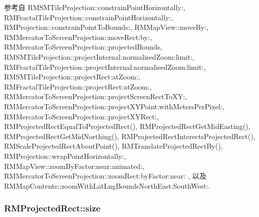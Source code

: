 参考自 R\-M\-S\-M\-Tile\-Projection\-::constrain\-Point\-Horizontally\-:, R\-M\-Fractal\-Tile\-Projection\-::constrain\-Point\-Horizontally\-:, R\-M\-Projection\-::constrain\-Point\-To\-Bounds\-:, R\-M\-Map\-View\-::move\-By\-:, R\-M\-Mercator\-To\-Screen\-Projection\-::move\-Rect\-:by\-:, R\-M\-Mercator\-To\-Screen\-Projection\-::projected\-Bounds, R\-M\-S\-M\-Tile\-Projection\-::project\-Internal\-:normalised\-Zoom\-:limit\-:, R\-M\-Fractal\-Tile\-Projection\-::project\-Internal\-:normalised\-Zoom\-:limit\-:, R\-M\-S\-M\-Tile\-Projection\-::project\-Rect\-:at\-Zoom\-:, R\-M\-Fractal\-Tile\-Projection\-::project\-Rect\-:at\-Zoom\-:, R\-M\-Mercator\-To\-Screen\-Projection\-::project\-Screen\-Rect\-To\-X\-Y\-:, R\-M\-Mercator\-To\-Screen\-Projection\-::project\-X\-Y\-Point\-:with\-Meters\-Per\-Pixel\-:, R\-M\-Mercator\-To\-Screen\-Projection\-::project\-X\-Y\-Rect\-:, R\-M\-Projected\-Rect\-Equal\-To\-Projected\-Rect(), R\-M\-Projected\-Rect\-Get\-Mid\-Easting(), R\-M\-Projected\-Rect\-Get\-Mid\-Northing(), R\-M\-Projected\-Rect\-Interects\-Projected\-Rect(), R\-M\-Scale\-Projected\-Rect\-About\-Point(), R\-M\-Translate\-Projected\-Rect\-By(), R\-M\-Projection\-::wrap\-Point\-Horizontally\-:, R\-M\-Map\-View\-::zoom\-By\-Factor\-:near\-:animated\-:, R\-M\-Mercator\-To\-Screen\-Projection\-::zoom\-Rect\-:by\-Factor\-:near\-: , 以及 R\-M\-Map\-Contents\-::zoom\-With\-Lat\-Lng\-Bounds\-North\-East\-:\-South\-West\-:.

\hypertarget{struct_r_m_projected_rect_a5714e79da5f5fc7530595b268f47dbb6}{
\subsubsection[{size}]{ R\-M\-Projected\-Rect\-::size}}\label{struct_r_m_projected_rect_a5714e79da5f5fc7530595b268f47dbb6}


